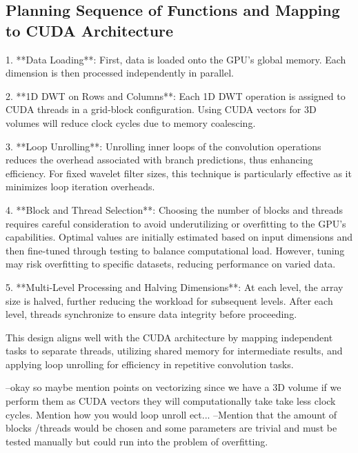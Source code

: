 \documentclass{article}
\begin{document}
\subsection{Planning Sequence of Functions and Mapping to CUDA Architecture}
1. **Data Loading**: First, data is loaded onto the GPU's global memory. Each dimension is then processed independently in parallel.
   
2. **1D DWT on Rows and Columns**: Each 1D DWT operation is assigned to CUDA threads in a grid-block configuration. Using CUDA vectors for 3D volumes will reduce clock cycles due to memory coalescing.
   
3. **Loop Unrolling**: Unrolling inner loops of the convolution operations reduces the overhead associated with branch predictions, thus enhancing efficiency. For fixed wavelet filter sizes, this technique is particularly effective as it minimizes loop iteration overheads.

4. **Block and Thread Selection**: Choosing the number of blocks and threads requires careful consideration to avoid underutilizing or overfitting to the GPU’s capabilities. Optimal values are initially estimated based on input dimensions and then fine-tuned through testing to balance computational load. However, tuning may risk overfitting to specific datasets, reducing performance on varied data.

5. **Multi-Level Processing and Halving Dimensions**: At each level, the array size is halved, further reducing the workload for subsequent levels. After each level, threads synchronize to ensure data integrity before proceeding.

This design aligns well with the CUDA architecture by mapping independent tasks to separate threads, utilizing shared memory for intermediate results, and applying loop unrolling for efficiency in repetitive convolution tasks.

--okay so maybe mention points on vectorizing since we have a 3D volume if we perform them as CUDA vectors they will computationally take take less clock cycles. Mention how you would loop unroll ect...
--Mention that the amount of blocks /threads would be chosen and some parameters are trivial and must be tested manually but could run into the problem of overfitting.
\end{document}
